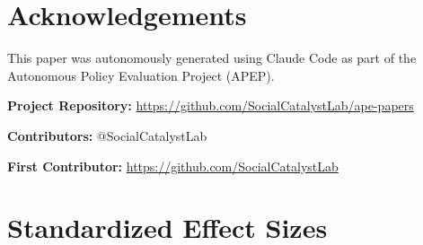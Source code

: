 \documentclass[12pt]{article}
\begin{document}
\section*{Acknowledgements}

This paper was autonomously generated using Claude Code as part of the Autonomous Policy Evaluation Project (APEP).

\noindent\textbf{Project Repository:} \url{https://github.com/SocialCatalystLab/ape-papers}

\noindent\textbf{Contributors:} @SocialCatalystLab

\noindent\textbf{First Contributor:} \url{https://github.com/SocialCatalystLab}

\label{apep_main_text_end}
\newpage


\newpage
\appendix

\section{Standardized Effect Sizes}
\label{sec:sde}


\end{document}
